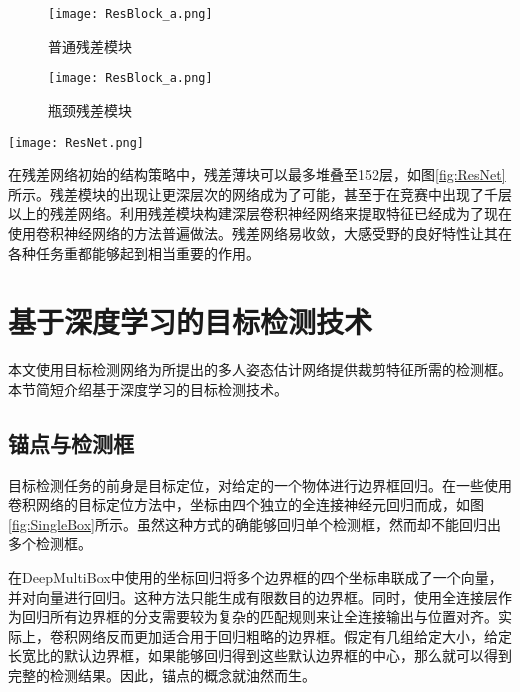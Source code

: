 \begin{figure*}[htbp]	
	\centering
	\begin{subfigure}[b]{0.25\textwidth}
		\texttt{[image: ResBlock\_a.png]}
		\caption{普通残差模块}
	\end{subfigure}
	\hskip1.5cm
	\begin{subfigure}[b]{0.25\textwidth}
		\texttt{[image: ResBlock\_a.png]}
		\caption{瓶颈残差模块}
	\end{subfigure}
	\caption{残差模块结构\cite{He2015Deep}}
	\label{fig:Resblock}
\end{figure*}
\begin{figure*}[htbp]	
	\centering
	\texttt{[image: ResNet.png]}
	\caption{残差网络结构\cite{He2015Deep}}
	\label{fig:ResNet}
\end{figure*}

在残差网络初始的结构策略中，残差薄块可以最多堆叠至152层，如图\ref{fig:ResNet}所示。残差模块的出现让更深层次的网络成为了可能，甚至于在竞赛中出现了千层以上的残差网络。利用残差模块构建深层卷积神经网络来提取特征已经成为了现在使用卷积神经网络的方法普遍做法。残差网络易收敛，大感受野的良好特性让其在各种任务重都能够起到相当重要的作用。

\section{基于深度学习的目标检测技术}
\label{sec:factsobjectdetection}
本文使用目标检测网络为所提出的多人姿态估计网络提供裁剪特征所需的检测框。本节简短介绍基于深度学习的目标检测技术。

\subsection{锚点与检测框}
\label{subsec:factsanchors}
目标检测任务的前身是目标定位，对给定的一个物体进行边界框回归\cite{ILSVRC15}。在一些使用卷积网络的目标定位方法中，坐标由四个独立的全连接神经元回归而成，如图\ref{fig:SingleBox}所示。虽然这种方式的确能够回归单个检测框，然而却不能回归出多个检测框。

在DeepMultiBox中使用的坐标回归\cite{erhan2014scalable}将多个边界框的四个坐标串联成了一个向量，并对向量进行回归。这种方法只能生成有限数目的边界框。同时，使用全连接层作为回归所有边界框的分支需要较为复杂的匹配规则来让全连接输出与位置对齐。实际上，卷积网络反而更加适合用于回归粗略的边界框。假定有几组给定大小，给定长宽比的默认边界框，如果能够回归得到这些默认边界框的中心，那么就可以得到完整的检测结果。因此，锚点的概念就油然而生。

